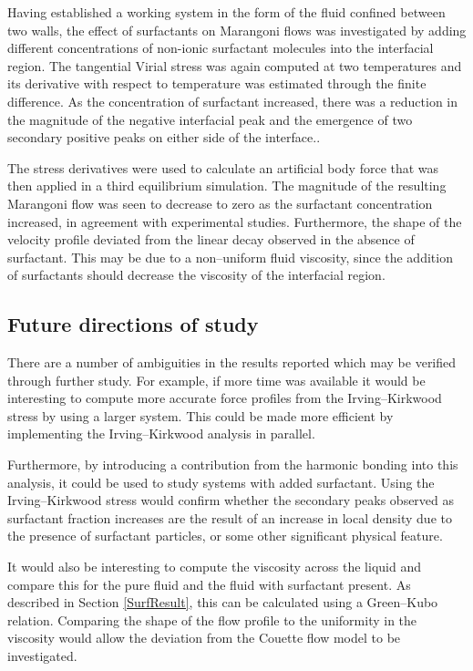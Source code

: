 Having established a working system in the form of the fluid confined between two walls, the effect of surfactants on Marangoni flows was investigated by adding different concentrations of non-ionic surfactant molecules into the interfacial region.
The tangential Virial stress was again computed at two temperatures and its derivative with respect to temperature was estimated through the finite difference.
As the concentration of surfactant increased, there was a reduction in the magnitude of the negative interfacial peak and the emergence of two secondary positive peaks on either side of the interface..

The stress derivatives were used to calculate an artificial body force that was then applied in a third equilibrium simulation.
The magnitude of the resulting Marangoni flow was seen to decrease to zero as the surfactant concentration increased, in agreement with experimental studies.
Furthermore, the shape of the velocity profile deviated from the linear decay observed in the absence of surfactant.
This may be due to a non--uniform fluid viscosity, since the addition of surfactants should decrease the viscosity of the interfacial region.

\subsection{Future directions of study}
There are a number of ambiguities in the results reported which may be verified through further study.
For example, if more time was available it would be interesting to compute more accurate force profiles from the Irving--Kirkwood stress by using a larger system.
This could be made more efficient by implementing the Irving--Kirkwood analysis in parallel.

Furthermore, by introducing a contribution from the harmonic bonding into this analysis, it could be used to study systems with added surfactant.
Using the Irving--Kirkwood stress would confirm whether the secondary peaks observed as surfactant fraction increases are the result of an increase in local density due to the presence of surfactant particles, or some other significant physical feature.

It would also be interesting to compute the viscosity across the liquid and compare this for the pure fluid and the fluid with surfactant present.
As described in Section \ref{SurfResult}, this can be calculated using a Green--Kubo relation.
Comparing the shape of the flow profile to the uniformity in the viscosity would allow the deviation from the Couette flow model to be investigated.

